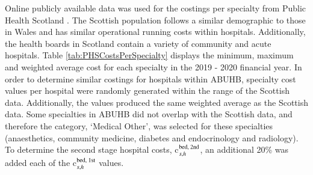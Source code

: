 \documentclass[../thesis.tex]{subfiles}
\begin{document}
Online publicly available data was used for the costings per specialty from Public Health Scotland \cite{PHS2021}. The Scottish population follows a similar demographic to those in Wales and has similar operational running costs within hospitals. Additionally, the health boards in Scotland contain a variety of community and acute hospitals. Table \ref{tab:PHSCostsPerSpecialty} displays the minimum, maximum and weighted average cost for each specialty in the 2019 - 2020 financial year. In order to determine similar costings for hospitals within ABUHB, specialty cost values per hospital were randomly generated within the range of the Scottish data. Additionally, the values produced the same weighted average as the Scottish data. Some specialties in ABUHB did not overlap with the Scottish data, and therefore the category, `Medical Other', was selected for these specialties (anaesthetics, community medicine, diabetes and endocrinology and radiology). To determine the second stage hospital costs, c$_{s,h}^{\textnormal{bed, 2nd}}$, an additional 20\% was added each of the c$_{s,h}^{\textnormal{bed, 1st}}$ values.
\end{document}
